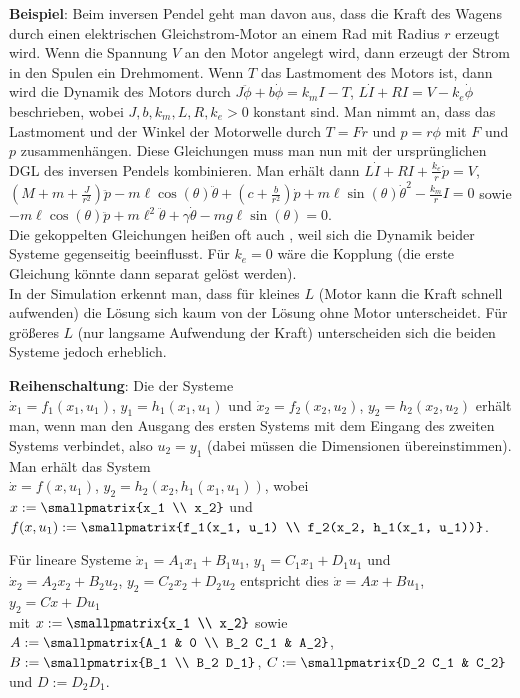\textbf{Beispiel}:
Beim inversen Pendel geht man davon aus, dass die Kraft des Wagens durch einen
elektrischen Gleichstrom-Motor an einem Rad mit Radius $r$ erzeugt wird.
Wenn die Spannung $V$ an den Motor angelegt wird, dann erzeugt der Strom in den Spulen
ein Drehmoment.
Wenn $T$ das Lastmoment des Motors ist, dann wird die Dynamik des Motors durch
$J\ddot{\phi} + b\dot{\phi} = k_m I - T$, $L\dot{I} + RI = V - k_e\dot{\phi}$
beschrieben, wobei $J, b, k_m, L, R, k_e > 0$ konstant sind.
Man nimmt an, dass das Lastmoment und der Winkel der Motorwelle durch
$T = Fr$ und $p = r\phi$ mit $F$ und $p$ zusammenhängen.
Diese Gleichungen muss man nun mit der ursprünglichen DGL des inversen Pendels kombinieren.
Man erhält dann
$L\dot{I} + RI + \frac{k_e}{r}\dot{p} = V$,\\
$\left(M + m + \frac{J}{r^2}\right)\ddot{p} - m\ell \cos(\theta)\ddot{\theta} +
\left(c + \frac{b}{r^2}\right)\dot{p} + m\ell \sin(\theta)\dot{\theta}^2 -
\frac{k_m}{r}I = 0$ sowie\\
$-m\ell \cos(\theta)\ddot{p} + m\ell^2\ddot{\theta} + \gamma \dot{\theta} -
mg\ell \sin(\theta) = 0$.\\
Die gekoppelten Gleichungen heißen oft auch ,
weil sich die Dynamik beider Systeme gegenseitig beeinflusst.
Für $k_e = 0$ wäre die Kopplung 
(die erste Gleichung könnte dann separat gelöst werden).\\
In der Simulation erkennt man, dass für kleines $L$ (Motor kann die Kraft schnell aufwenden)
die Lösung sich kaum von der Lösung ohne Motor unterscheidet.
Für größeres $L$ (nur langsame Aufwendung der Kraft) unterscheiden sich
die beiden Systeme jedoch erheblich.

\linie

\textbf{Reihenschaltung}:
Die  der Systeme\\
$\dot{x}_1 = f_1(x_1, u_1)$, $y_1 = h_1(x_1, u_1)$ und
$\dot{x}_2 = f_2(x_2, u_2)$, $y_2 = h_2(x_2, u_2)$
erhält man, wenn man den Ausgang des ersten Systems mit dem Eingang des zweiten Systems
verbindet, also $u_2 = y_1$
(dabei müssen die Dimensionen übereinstimmen).
Man erhält das System\\
$\dot{x} = f(x, u_1)$, $y_2 = h_2(x_2, h_1(x_1, u_1))$,
wobei $x := \smallpmatrix{x_1 \\ x_2}$ und
$f(x, u_1) := \smallpmatrix{f_1(x_1, u_1) \\ f_2(x_2, h_1(x_1, u_1))}$.

Für lineare Systeme
$\dot{x}_1 = A_1 x_1 + B_1 u_1$, $y_1 = C_1 x_1 + D_1 u_1$ und\\
$\dot{x}_2 = A_2 x_2 + B_2 u_2$, $y_2 = C_2 x_2 + D_2 u_2$ entspricht dies
$\dot{x} = Ax + Bu_1$, $y_2 = Cx + Du_1$\\
mit $x := \smallpmatrix{x_1 \\ x_2}$ sowie
$A := \smallpmatrix{A_1 & 0 \\ B_2 C_1 & A_2}$,
$B := \smallpmatrix{B_1 \\ B_2 D_1}$,
$C := \smallpmatrix{D_2 C_1 & C_2}$ und
$D := D_2 D_1$.

